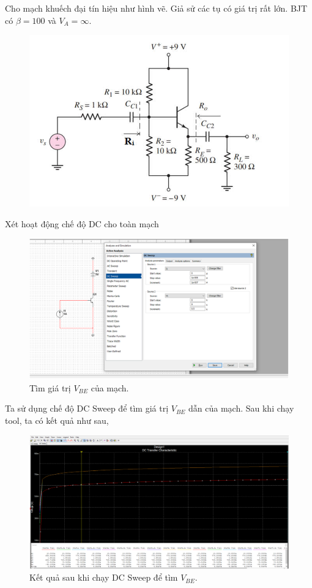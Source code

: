 
Cho mạch khuếch đại tín hiệu như hình vẽ. Giả sử các tụ có giá trị rất lớn. BJT có $\beta = 100$ và $V_{A} = \infty$.

\begin{figure}[H]
	\centering
	\includegraphics[width=.8\linewidth]{./my-chapters/my-images/Question3/debai.png}
\end{figure}


Xét hoạt động chế độ DC cho toàn mạch

\begin{figure}[H]
	\centering
	\includegraphics[width=.9\linewidth]{./my-chapters/my-images/Question3/a_timvbe.png}
	\caption{Tìm giá trị $V_{BE}$ của mạch.}
\end{figure}

Ta sử dụng chế độ DC Sweep để tìm giá trị $V_{BE}$ dẫn của mạch. Sau khi chạy tool, ta có kết quả như sau,

\begin{figure}[H]
	\centering
	\includegraphics[width=.9\linewidth]{./my-chapters/my-images/Question3/a_giatriVbe.png}
	\caption{Kết quả sau khi chạy DC Sweep để tìm $V_{BE}$.}
\end{figure}

